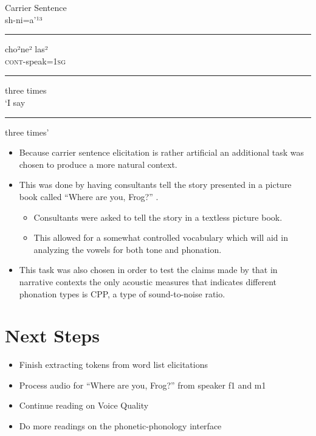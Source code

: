 \documentclass[12pt, letterpaper]{article}
\begin{document}
\ea Carrier Sentence \label{ex:carrier}\\
\gll sh-ni=a'¹³ \rule{10mm}{1pt} cho²ne² las²\\ 
\textsc{cont}-speak=1\textsc{sg} \rule{10mm}{1pt} three times\\
\trans `I say \rule{10mm}{1pt} three times'	
\z 

\begin{itemize}
	\item Because carrier sentence elicitation is rather artificial an additional task was chosen to produce a more natural context. 
	\item This was done by having consultants tell the story presented in a picture book called ``Where are you, Frog?'' \citep{mayerFrogWhereAre1969}. 
	\begin{itemize}
		\item Consultants were asked to tell the story in a textless picture book. 
		\item This allowed for a somewhat controlled vocabulary which will aid in analyzing the vowels for both tone and phonation. 
	\end{itemize}
	\item This task was also chosen in order to test the claims made by \citet{garellekPhoneticsWhiteHmong2021} that in narrative contexts the only acoustic measures that indicates different phonation types is CPP, a type of sound-to-noise ratio.
	
\end{itemize}
\section{Next Steps} \label{sec:Methodology}
\begin{itemize}
	\item Finish extracting tokens from word list elicitations
	\item Process audio for ``Where are you, Frog?'' from speaker f1 and m1
	\item Continue reading \citet{eslingVoiceQualityLaryngeal2019} on Voice Quality
	\item Do more readings on the phonetic-phonology interface \citep{keatingPhonologyphoneticsInterface1996,zsigaPhonologyPhoneticsInterface2020}
\end{itemize}

\end{document}
